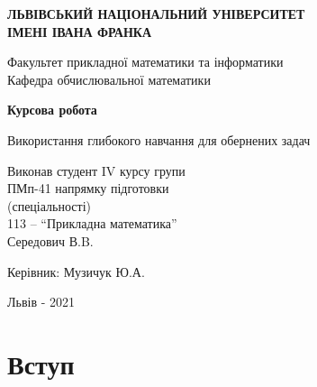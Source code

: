 \documentclass[14pt,a4paper]{extarticle}
\newcounter{e}
\newcounter{tabl}
\numberwithin{equation}{section}
\numberwithin{figure}{section}
\begin{document}
	\thispagestyle{empty}
	\begin{center}
		{\textbf{ЛЬВІВСЬКИЙ НАЦІОНАЛЬНИЙ УНІВЕРСИТЕТ \\ ІМЕНІ ІВАНА ФРАНКА}}\par
		{Факультет прикладної математики та інформатики \\ Кафедра обчислювальної математики}\par
		\vspace{40mm}
		{\textbf{\huge{Курсова робота}}}\par
		\vspace{5mm}
		{\large{Використання глибокого навчання для обернених задач}}\par
		\vspace{5mm}\par %
	\end{center}
	
	\vfill
	\vskip80pt
	
	\begin{flushleft}
		\hskip 8cm 
		Виконав студент IV курсу групи
		\\ \hskip8cm
		ПМп-41 напрямку підготовки 
		\\ \hskip8cm
		(спеціальності)
		\\ \hskip8cm
		113 -- ``Прикладна математика''
		\\ \hskip8cm
		Середович В.B.
	\end{flushleft}
	\begin{flushleft}
		\hskip8cm 
		Керівник: Музичук Ю.А.
	\end{flushleft}
	
	\vfill
	
	\begin{center}
		\large
		Львів - 2021
	\end{center}


	\newpage
	\thispagestyle{empty}
	\tableofcontents

	\newpage
	\thispagestyle{empty}
	\section*{Вступ}
	\begin{center}\end{center}
	
\end{document}
